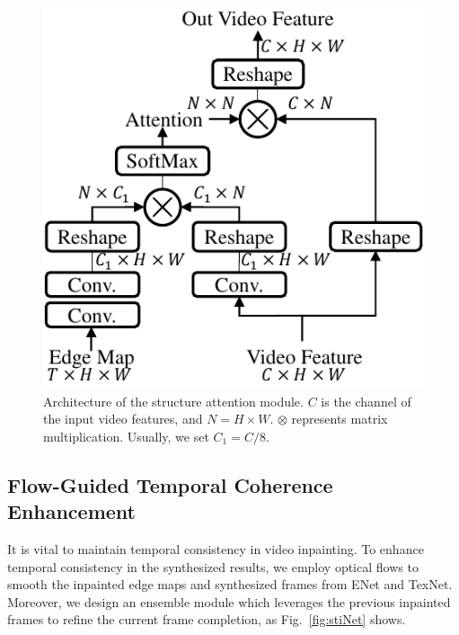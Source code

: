  \begin{figure}[t]
	\centering
	\includegraphics[width=0.7\columnwidth]{SEM} %
	\caption{Architecture of the structure attention module. $C$ is the channel of the input video features, and $N=H\times W$. $\otimes$ represents matrix multiplication. Usually, we set $C_1=C/8$.}
	\label{SEM}
\end{figure} 





\subsection{Flow-Guided Temporal Coherence Enhancement}
\label{sec:fec}
It is vital to maintain temporal consistency in video inpainting.
To enhance temporal consistency in the synthesized results, we employ optical flows to smooth the inpainted edge maps and synthesized frames from ENet and TexNet.
Moreover, we design an ensemble module which leverages the previous inpainted frames to refine the current frame completion, as Fig.~\ref{fig:stiNet} shows. 



